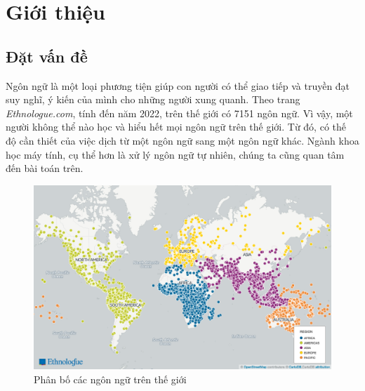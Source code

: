 \chapter{Giới thiệu}
\label{Chapter1}



\section{Đặt vấn đề}
Ngôn ngữ là một loại phương tiện giúp con người có thể giao tiếp và truyền đạt suy nghĩ, ý kiến của mình cho những người xung quanh. Theo trang \textit{Ethnologue.com}\cite{Ethnologue}, tính đến năm 2022, trên thế giới có 7151 ngôn ngữ. Vì vậy, một người không thể nào học và hiểu hết mọi ngôn ngữ trên thế giới. Từ đó, có thế độ cần thiết của việc dịch từ một ngôn ngữ sang một ngôn ngữ khác. Ngành khoa học máy tính, cụ thể hơn là xử lý ngôn ngữ tự nhiên, chúng ta cũng quan tâm đến bài toán trên.

\begin{figure}[H]
    \begin{center}
        \includegraphics[scale=0.4]{images/number_of_langs}
        \caption{Phân bố các ngôn ngữ trên thế giới\cite{Ethnologue}}
        \label{fig:languages_distibuttion}
    \end{center}
\end{figure}

